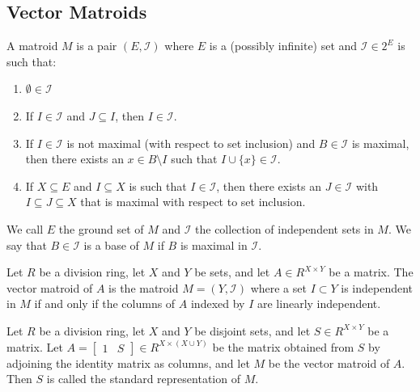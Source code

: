 \subsection{Vector Matroids}

\begin{definition}
    \label{Matroid}
    \leanok
    A matroid $M$ is a pair $(E, \mathcal{I})$ where $E$ is a (possibly infinite) set and $\mathcal I \in 2^E$ is such that:
    \begin{enumerate}
        \item $\emptyset \in \mathcal I$
        \item If $I \in \mathcal I$ and $J \subseteq I$, then $I \in \mathcal I$.
        \item If $I \in \mathcal I$ is not maximal (with respect to set inclusion) and $B \in \mathcal I$ is maximal,
            then there exists an $x \in B \setminus I$ such that $I \cup \{x\} \in \mathcal{I}$.
        \item If $X \subseteq E$ and $I \subseteq X$ is such that $I \in \mathcal I$, then there exists an $J \in \mathcal I$ with $I \subseteq J \subseteq X$
            that is maximal with respect to set inclusion.
    \end{enumerate}
    We call $E$ the ground set of $M$ and $\mathcal{I}$ the collection of independent sets in $M$. We say that $B \in \mathcal I$ is a base of $M$ if $B$ is maximal in $\mathcal I$.
\end{definition}

\begin{definition}
    \label{VectorMatroid}
    \leanok
    Let $R$ be a division ring, let $X$ and $Y$ be sets, and let $A \in R^{X \times Y}$ be a matrix. The vector matroid of $A$ is the matroid $M = (Y, \mathcal{I})$ where a set $I \subset Y$ is independent in $M$ if and only if the columns of $A$ indexed by $I$ are linearly independent.
\end{definition}

\begin{definition}
    \label{StandardRepr}
    \leanok
    Let $R$ be a division ring, let $X$ and $Y$ be disjoint sets, and let $S \in R^{X \times Y}$ be a matrix. Let $A = \begin{bmatrix} 1 & S \end{bmatrix} \in R^{X \times (X \cup Y)}$ be the matrix obtained from $S$ by adjoining the identity matrix as columns, and let $M$ be the vector matroid of $A$. Then $S$ is called the standard representation of $M$.
\end{definition}

